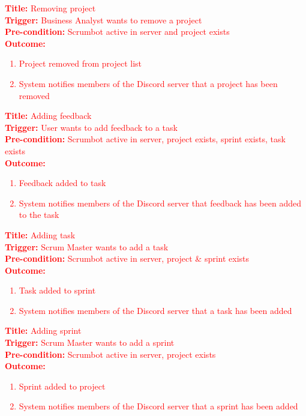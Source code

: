 \documentclass[12pt, titlepage]{article}
\begin{document}
\noindent \textcolor{red}{\textbf{Title: }Removing project}\\
\textcolor{red}{\textbf{Trigger: }Business Analyst wants to remove a project}\\
\textcolor{red}{\textbf{Pre-condition: }Scrumbot active in server and project exists}\\
\textcolor{red}{\textbf{Outcome: }}
\textcolor{red}{
\begin{enumerate}
    \item Project removed from project list
    \item System notifies members of the Discord server that a project has been removed
\end{enumerate}
}

\noindent \textcolor{red}{\textbf{Title: }Adding feedback}\\
\textcolor{red}{\textbf{Trigger: }User wants to add feedback to a task}\\
\textcolor{red}{\textbf{Pre-condition: }Scrumbot active in server, project exists, sprint exists, task exists}\\
\textcolor{red}{\textbf{Outcome: }}
\textcolor{red}{
\begin{enumerate}
    \item Feedback added to task
    \item System notifies members of the Discord server that feedback has been added to the task
\end{enumerate}
}

\noindent \textcolor{red}{\textbf{Title: }Adding task}\\
\textcolor{red}{\textbf{Trigger: }Scrum Master wants to add a task}\\
\textcolor{red}{\textbf{Pre-condition: }Scrumbot active in server, project \& sprint exists}\\
\textcolor{red}{\textbf{Outcome: }}
\textcolor{red}{
\begin{enumerate}
    \item Task added to sprint
    \item System notifies members of the Discord server that a task has been added
\end{enumerate}
}

\noindent \textcolor{red}{\textbf{Title: }Adding sprint}\\
\textcolor{red}{\textbf{Trigger: }Scrum Master wants to add a sprint}\\
\textcolor{red}{\textbf{Pre-condition: }Scrumbot active in server, project exists}\\
\textcolor{red}{\textbf{Outcome: }}
\textcolor{red}{
\begin{enumerate}
    \item Sprint added to project
    \item System notifies members of the Discord server that a sprint has been added
\end{enumerate}
}
\end{document}
